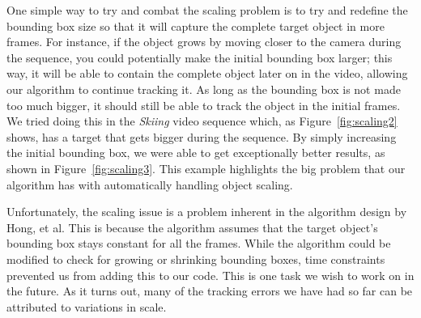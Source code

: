 \documentclass{sig-alternate-05-2015}
\begin{document}

One simple way to try and combat the scaling problem is to try and redefine the bounding box size so that it will capture the complete target object in more frames.
For instance, if the object grows by moving closer to the camera during the sequence, you could potentially make the initial bounding box larger; this way, it will be able to contain the complete object later on in the video, allowing our algorithm to continue tracking it.
As long as the bounding box is not made too much bigger, it should still be able to track the object in the initial frames.
We tried doing this in the \textit{Skiing} video sequence which, as Figure~\ref{fig:scaling2} shows, has a target that gets bigger during the sequence.
By simply increasing the initial bounding box, we were able to get exceptionally better results, as shown in Figure~\ref{fig:scaling3}.
This example highlights the big problem that our algorithm has with automatically handling object scaling.

Unfortunately, the scaling issue is a problem inherent in the algorithm design by Hong, et al.
This is because the algorithm assumes that the target object's bounding box stays constant for all the frames.
While the algorithm could be modified to check for growing or shrinking bounding boxes, time constraints prevented us from adding this to our code.
This is one task we wish to work on in the future.
As it turns out, many of the tracking errors we have had so far can be attributed to variations in scale.
\end{document}
